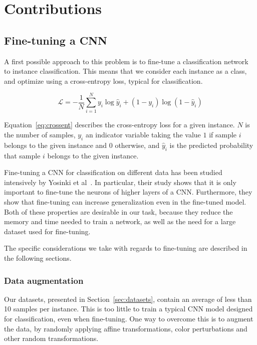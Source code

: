 
\chapter{Contributions}
\section{Fine-tuning a CNN}\label{sec:finetuning}
A first possible approach to this problem is to fine-tune
a classification network to instance classification. This means that
we consider each instance as a class, and optimize using a cross-entropy
loss, typical for classification.

\begin{equation}\label{eq:crossent}
\mathcal{L} = - \frac{1}{N}
\sum_{i=1}^N y_i \log \hat{y}_i + (1-y_i) \log (1-\hat{y}_i)
\end{equation}

Equation~\ref{eq:crossent} describes the cross-entropy loss for a
given instance. $N$ is the number of samples, $y_i$ an indicator
variable taking the value $1$ if sample $i$ belongs to the given
instance and $0$ otherwise, and $\hat{y}_i$ is the predicted probability
that sample $i$ belongs to the given instance.

Fine-tuning a CNN for classification on different data has been studied
intensively by Yosinki et al~\cite{yosinski_how_2014}. In particular,
their study shows that it is only important to fine-tune the neurons
of higher layers of a CNN. Furthermore, they show that
fine-tuning can increase generalization even in the fine-tuned model.
Both of these properties are desirable in our task, because they reduce
the memory and time needed to train a network, as well as the need
for a large dataset used for fine-tuning.

The specific considerations we take with regards to fine-tuning are
described in the following sections.

\subsection{Data augmentation}
Our datasets, presented in Section~\ref{sec:datasets},
contain an average of less than 10 samples per instance. This is too little
to train a typical CNN model designed for classification, even when
fine-tuning.
One way to overcome this is to augment the data, by randomly applying
affine transformations, color perturbations and other random transformations.

